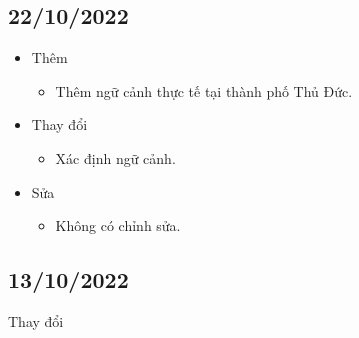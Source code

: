     \subsection{22/10/2022}
    \begin{itemize}
        \item Thêm
            \begin{itemize}
                \item  Thêm ngữ cảnh thực tế tại thành phố Thủ Đức. 
            \end{itemize}
        \item Thay đổi
            \begin{itemize}
                \item Xác định ngữ cảnh. 
            \end{itemize}
        \item Sửa
            \begin{itemize}
                \item Không có chỉnh sửa.
            \end{itemize}
    \end{itemize}

    \subsection{13/10/2022}
        \item Thay đổi